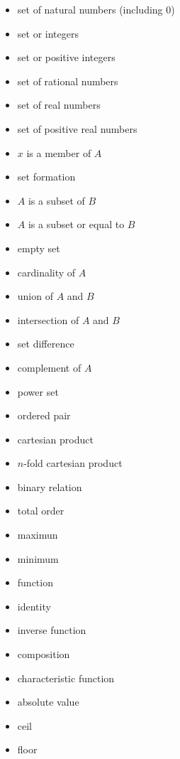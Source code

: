 \begin{itemize}[leftmargin=1.5cm]

%
%


\item [$\mathbb{N}$] set of natural numbers (including $0$)
\item [$\mathbb{Z}$] set or integers
\item [$mathbb{Z}_{\geq 0}$] set or positive integers
\item [$\mathbb{Q}$] set of rational numbers
\item [$\mathbb{R}$] set of real numbers
\item [$\mathbb{R}_{\geq 0}$] set of positive real numbers
\item [$x\in A$] $x$ is a member of $A$
\item [$:$] set formation
\item [$A\subset B$] $A$ is a subset of $B$
\item [$A\subseteq B$] $A$ is a subset or equal to $B$
\item [$\varnothing$] empty set
\item [$d(A)$] cardinality of $A$
\item [$A\cup B$] union of $A$ and $B$
\item [$A\cap B$] intersection of $A$ and $B$
\item [$A \backslash B$] set difference
\item [$\bar{A}$] complement of $A$
\item [$\mathcal{P}(A)$] power set 


\item [$(x, y)$] ordered pair
\item [$A \times B$] cartesian product
\item [$A^n$] $n$-fold cartesian product
\item [$R$] binary relation
\item [$\leq$] total order
\item [$\max(A)$] maximun
\item [$\min(A)$] minimum


\item [$f(x) = y$] function
\item [$I_A$] identity
\item [$f^{-1}$] inverse function
\item [$f \circ g$] composition
\item [$1_A$] characteristic function
\item [$abs(x)$] absolute value
\item [$\lceil x \rceil$] ceil
\item [$\lfloor x \rfloor$] floor


\end{itemize}
